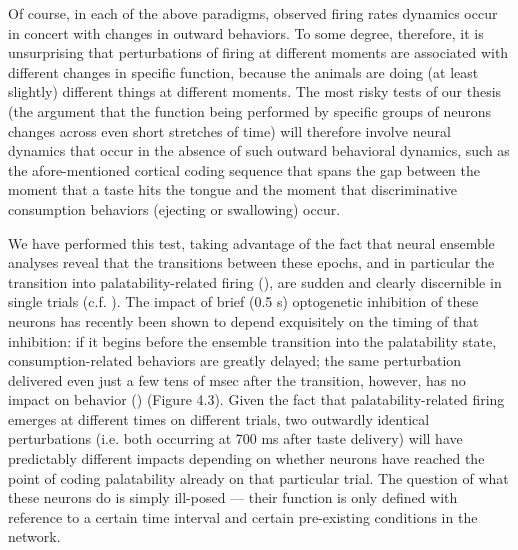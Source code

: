 \begin{refsection}
Of course, in each of the above paradigms, observed firing rates dynamics occur in concert with changes in outward behaviors. To some degree, therefore, it is unsurprising that perturbations of firing at different moments are associated with different changes in specific function, because the animals are doing (at least slightly) different things at different moments. The most risky tests of our thesis (the argument that the function being performed by specific groups of neurons changes across even short stretches of time) will therefore involve neural dynamics that occur in the absence of such outward behavioral dynamics, such as the afore-mentioned cortical coding sequence that spans the gap between the moment that a taste hits the tongue and the moment that discriminative consumption behaviors (ejecting or swallowing) occur.

We have performed this test, taking advantage of the fact that neural ensemble analyses reveal that the transitions between these epochs, and in particular the transition into palatability-related firing (\cite{sadacca2016a}), are sudden and clearly discernible in single trials (c.f. \cite{jones2007a}). The impact of brief (0.5 s) optogenetic inhibition of these neurons has recently been shown to depend exquisitely on the timing of that inhibition: if it begins before the ensemble transition into the palatability state, consumption-related behaviors are greatly delayed; the same perturbation delivered even just a few tens of msec after the transition, however, has no impact on behavior (\cite{mukherjee2019a}) (Figure 4.3). Given the fact that palatability-related firing emerges at different times on different trials, two outwardly identical perturbations (i.e. both occurring at 700 ms after taste delivery) will have predictably different impacts depending on whether neurons have reached the point of coding palatability already on that particular trial. The question of what these neurons do is simply ill-posed — their function is only defined with reference to a certain time interval and certain pre-existing conditions in the network.


\end{refsection}
